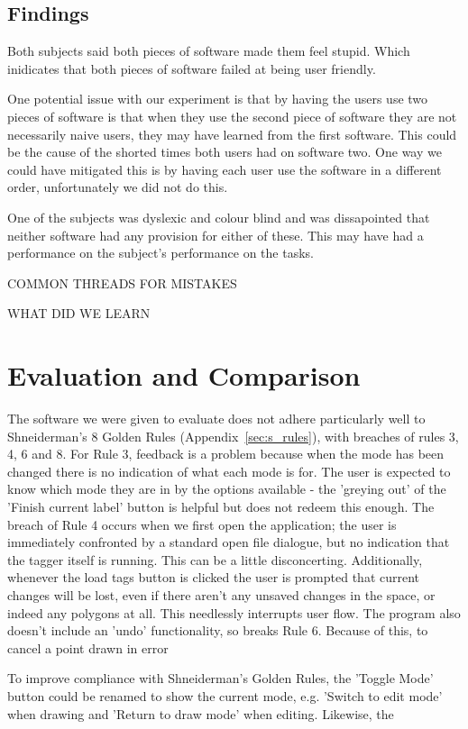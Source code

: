 \documentclass[a4paper,11pt,oneside]{article}
\begin{document}
\subsection{Findings}
Both subjects said both pieces of software made them feel stupid.  Which inidicates that both pieces of software failed at being user friendly.

One potential issue with our experiment is that by having the users use two pieces of software is that when they use the second piece of software they are not necessarily naive users, they may have learned from the first software.  This could be the cause of the shorted times both users had on software two.  One way we could have mitigated this is by having each user use the software in a different order, unfortunately we did not do this.

One of the subjects was dyslexic and colour blind and was dissapointed that neither software had any provision for either of these.  This may have had a performance on the subject's performance on the tasks.

COMMON THREADS FOR MISTAKES

WHAT DID WE LEARN

\section{Evaluation and Comparison}

The software we were given to evaluate does not adhere particularly well to Shneiderman's 8 Golden Rules (Appendix~\ref{sec:s_rules}), with breaches of rules 3, 4, 6 and 8. For Rule 3, feedback is a problem because when the mode has been changed there is no indication of what each mode is for. The user is expected to know which mode they are in by the options available - the 'greying out' of the 'Finish current label' button is helpful but does not redeem this enough. The breach of Rule 4 occurs when we first open the application; the user is immediately confronted by a standard open file dialogue, but no indication that the tagger itself is running. This can be a little disconcerting. Additionally, whenever the load tags button is clicked the user is prompted that current changes will be lost, even if there aren't any unsaved changes in the space, or indeed any polygons at all. This needlessly interrupts user flow. The program also doesn't include an 'undo' functionality, so breaks Rule 6. Because of this, to cancel a point drawn in error

To improve compliance with Shneiderman's Golden Rules, the 'Toggle Mode' button could be renamed to show the current mode, e.g. 'Switch to edit mode' when drawing and 'Return to draw mode' when editing. Likewise, the 
\end{document}
